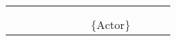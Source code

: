\begin{table}[]
{\begin{tabular}{lllllllllll}
                          &                           &                   &                                                                          &                                                                        &                           &                                                             &                                                                            &                                                                           &                                 & \cellcolor[HTML]{FC8D59}   \\
                          &                           &                   & \cellcolor[HTML]{FC8D59}    &                                                                        &                           &                                                             &                                                                            &                                                                           &                                 &                                                                        \\
                          &                           &                   &                                                                          & \cellcolor[HTML]{FC8D59}   &                           &                                                             &                                                                            &                                                                           &                                 &                                                                        \\
                          &                           &                   &                                                                          &                                                                        &                           &                                                             & \cellcolor[HTML]{FC8D59}$\{\text{Actor}\}$                                 &                                                                           &                                 &                                                                        \\
\end{tabular}%
}
\end{table}

